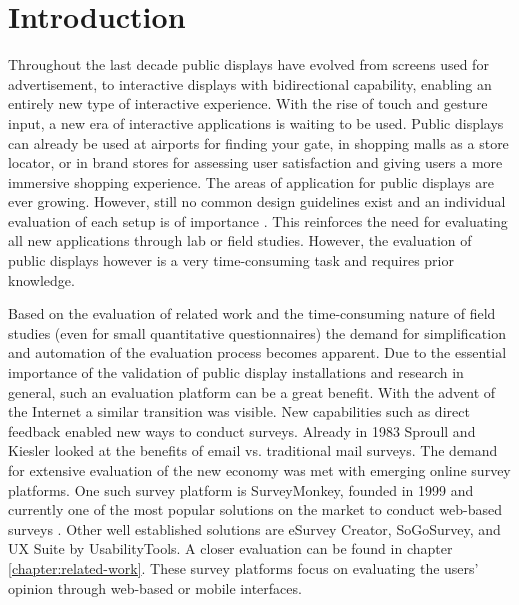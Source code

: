 \section{Introduction}
\label{sec:introduction}

	Throughout the last decade public displays have evolved from screens used for advertisement, to interactive displays with bidirectional capability, enabling an entirely new type of interactive experience. With the rise of touch and gesture input, a new era of interactive applications is waiting to be used. Public displays can already be used at airports for finding your gate, in shopping malls as a store locator, or in brand stores for assessing user satisfaction and giving users a more immersive shopping experience. The areas of application for public displays are ever growing. However, still no common design guidelines exist \cite{Alt2012HowToEvaluate} and an individual evaluation of each setup is of importance \cite{muller2010requirements}. This reinforces the need for evaluating all new applications through lab or field studies. However, the evaluation of public displays however is a very time-consuming task and requires prior knowledge. 


	Based on the evaluation of related work and the time-consuming nature of field studies (even for small quantitative questionnaires) the demand for simplification and automation of the evaluation process becomes apparent. Due to the essential importance of the validation of public display installations and research in general, such an evaluation platform can be a great benefit. 
	With the advent of the Internet a similar transition was visible. New capabilities such as direct feedback enabled new ways to conduct surveys. Already in 1983 Sproull and Kiesler \cite{sproull1986reducing} looked at the benefits of email vs. traditional mail surveys. The demand for extensive evaluation of the new economy was met with emerging online survey platforms. One such survey platform is SurveyMonkey, founded in 1999 and currently one of the most popular solutions on the market to conduct web-based surveys \cite{SurveyMonkeyAboutUs}. Other well established solutions are eSurvey Creator, SoGoSurvey, and UX Suite by UsabilityTools. A closer evaluation can be found in chapter \ref{chapter:related-work}. These survey platforms focus on evaluating the users' opinion through web-based or mobile interfaces. 


